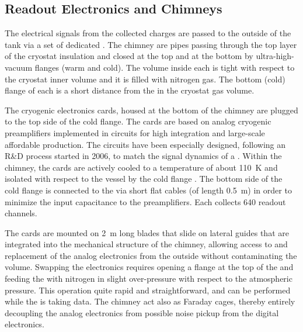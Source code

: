 \subsection{Readout Electronics and Chimneys}
\label{v4:fddp-ov:electronics}

The electrical signals from the collected charges are passed to the outside of the tank via a set of dedicated . The chimney are pipes passing through the top layer of the cryostat insulation and closed at the top and at the bottom by ultra-high-vacuum flanges (warm and cold). The volume inside each  is tight with respect to the cryostat inner volume and it is filled with nitrogen gas. The bottom (cold) flange of each  is a short distance %
from the  in the cryostat gas volume.

The cryogenic  electronics cards, housed at the bottom of the chimney are plugged to the top side of  the cold flange. The  cards are based on analog cryogenic preamplifiers implemented in   circuits for high integration and large-scale affordable production. 
The  circuits have been especially designed, following an R\&D process started in 2006, to match the signal dynamics of a . Within the chimney, the cards are actively cooled to a temperature of about \SI{110}{K} and isolated with respect to the \lar vessel by the cold flange \fdth{}.  The bottom side of the cold flange is connected to the  via short flat cables (of length \SI{0.5}{m}) in order to minimize the input capacitance to the preamplifiers. Each  collects \num{640} readout channels. 


The  cards are mounted on \SI{2}{m} long blades that slide on lateral guides that are integrated into the mechanical structure of the chimney, allowing access to and replacement of the analog  electronics from the outside without contaminating the \lar volume. 
Swapping the  electronics requires opening a flange at the top of the  and feeding the  with nitrogen in slight over-pressure with respect to the atmospheric pressure.  This operation quite rapid and straightforward, and can be performed while the  is taking data. The chimney act also as Faraday cages, thereby entirely decoupling the analog  electronics %
from possible noise pickup from the digital electronics.   

